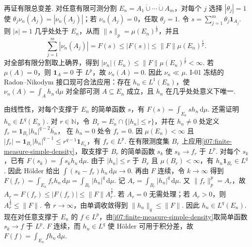 \begin{FAProof}
再证有限总变差. 对任意有限可测分割 \(\displaystyle E_n=A_1\dot\cup\cdots\dot\cup A_m\)，对每个 \(\displaystyle j\) 选择 \(\displaystyle |\theta_j|=1\) 使 \(\displaystyle \theta_j\nu_n(A_j)=|\nu_n(A_j)|\)；若 \(\displaystyle \nu_n(A_j)=0\)，任取 \(\displaystyle \theta_j=1\). 令 \(\displaystyle s=\sum_{j=1}^m\theta_j\mathbf1_{A_j}\).
则 \(\displaystyle |s|=1\) 几乎处处于 \(\displaystyle E_n\)，从而 \(\displaystyle \|s\|_p=\mu(E_n)^{\frac{1}{p}}\)，并且
\[
\sum_{j=1}^m|\nu_n(A_j)|
=F(s)
\leqslant|F(s)|
\leqslant\|F\|\mu(E_n)^{\frac{1}{p}}.
\]
对全部有限分割取上确界，得到 \(\displaystyle |\nu_n|(E_n)\leqslant\|F\|\mu(E_n)^{\frac{1}{p}}<\infty\). 若 \(\displaystyle \mu(A)=0\)，则 \(\displaystyle \mathbf1_A=0\) 于 \(\displaystyle L^p\)，故 \(\displaystyle \nu_n(A)=0\). 因此 \(\displaystyle \nu_n\ll\mu\). I-01 冻结的 Radon--Nikodym 接口现可合法应用：存在 \(\displaystyle h_n\in L^1(E_n)\)，使 \(\displaystyle \nu_n(A)=\int_Ah_n\,\mathrm{d}\mu\)
对全部可测 \(\displaystyle A\subseteq E_n\) 成立，且 \(\displaystyle h_n\) 在几乎处处意义下唯一.

由线性性，对每个支撑于 \(\displaystyle E_n\) 的简单函数 \(\displaystyle s\)，有 \(\displaystyle F(s)=\int_{E_n}s h_n\,\mathrm{d}\mu\).
还需证明 \(\displaystyle h_n\in L^q(E_n)\). 对 \(\displaystyle r\in\mathbb N\)，令 \(\displaystyle B_r=E_n\cap\{|h_n|\leqslant r\}\)，并在 \(\displaystyle h_n\neq0\) 处定义 \(\displaystyle f_r=\mathbf1_{B_r}|h_n|^{q-2}\overline{h_n}\)，
在 \(\displaystyle h_n=0\) 处令 \(\displaystyle f_r=0\). 因 \(\displaystyle \mu(E_n)<\infty\) 且 \(\displaystyle |f_r|=\mathbf1_{B_r}|h_n|^{q-1}\leqslant r^{q-1}\mathbf1_{E_n}\)，有 \(\displaystyle f_r\in L^p\). 在有限测度集 \(\displaystyle B_r\) 上应用\autoref{i07:finite-measure-simple-density}，取支撑于 \(\displaystyle B_r\) 的简单函数 \(\displaystyle s_k\) 使 \(\displaystyle s_k\to f_r\) 于 \(\displaystyle L^p\). 对每个 \(\displaystyle s_k\)，已有 \(\displaystyle F(s_k)=\int s_kh_n\,\mathrm{d}\mu\). 由于 \(\displaystyle |h_n|\leqslant r\) 于 \(\displaystyle B_r\) 且 \(\displaystyle \mu(B_r)<\infty\)，有 \(\displaystyle h_n\mathbf1_{B_r}\in L^q\). 因此 Hölder 给出 \(\displaystyle \int(s_k-f_r)h_n\,\mathrm{d}\mu\to0\). 再由 \(\displaystyle F\) 连续，令 \(\displaystyle k\to\infty\) 得到 \(\displaystyle F(f_r)=\int_{E_n}f_rh_n\,\mathrm{d}\mu =\int_{B_r}|h_n|^q\,\mathrm{d}\mu\).
记 \(\displaystyle A_r=\int_{B_r}|h_n|^q\,\mathrm{d}\mu\). 又 \(\displaystyle \|f_r\|_p^p=A_r\)，故 \(\displaystyle A_r =F(f_r) \leqslant|F(f_r)| \leqslant\|F\|A_r^{\frac{1}{p}}\).
若 \(\displaystyle A_r=0\) 无需处理；若 \(\displaystyle A_r>0\)，则 \(\displaystyle A_r^{\frac{1}{q}}\leqslant\|F\|\). 令 \(\displaystyle r\to\infty\)，由单调收敛得到 \(\displaystyle \|h_n\|_q\leqslant\|F\|\).
因此 \(\displaystyle h_n\in L^q(E_n)\). 现在对任意支撑于 \(\displaystyle E_n\) 的 \(\displaystyle f\in L^p\)，由\autoref{i07:finite-measure-simple-density}取简单函数 \(\displaystyle s_k\to f\) 于 \(\displaystyle L^p\). \(\displaystyle F\) 连续，而 \(\displaystyle h_n\in L^q\) 使 Hölder 可用于积分差，故 \(\displaystyle F(f)=\int_{E_n}fh_n\,\mathrm{d}\mu\).


\end{FAProof}
